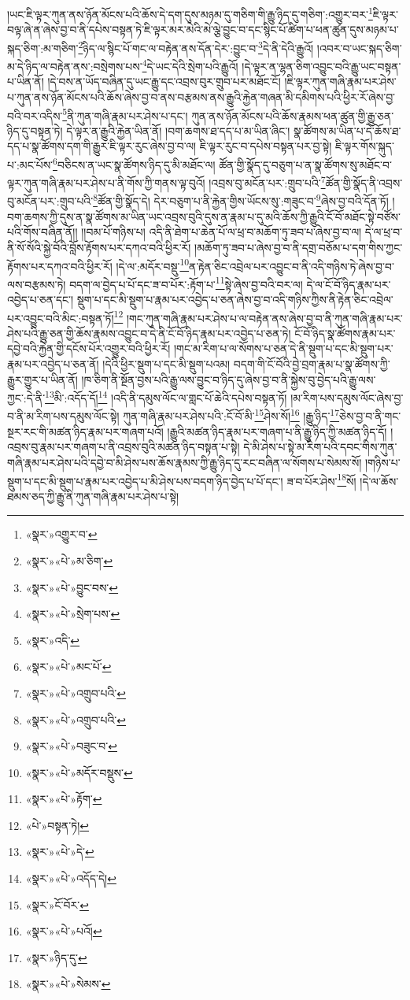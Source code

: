 །ཡང་ཇི་ལྟར་ཀུན་ནས་ཉོན་མོངས་པའི་ཆོས་དེ་དག་དུས་མཉམ་དུ་གཅིག་གི་རྒྱུ་ཉིད་དུ་གཅིག་:འགྱུར་བར་\footnote{«སྣར་»འགྱུར་བ་}ཇི་ལྟར་བལྟ་ཞེ་ན་ཞེས་བྱ་བ་ནི་དཔེས་བསྟན་ཏེ་ཇི་ལྟར་མར་མེའི་མེ་ལྕེ་བྱུང་བ་དང་སྙིང་པོ་ཚིག་པ་ཕན་ཚུན་དུས་མཉམ་པ་སྐད་ཅིག་:མ་གཅིག་\footnote{«སྣར་»«པེ་»མ་ཅིག་}ཉིད་ལ་སྙིང་པོ་གང་ལ་བརྟེན་ནས་དོན་དེར་:བྱུང་བ་\footnote{«སྣར་»«པེ་»བྱུང་བས་}དེ་ནི་དེའི་རྒྱུའོ། །འབར་བ་ཡང་སྐད་ཅིག་མ་དེ་ཉིད་ལ་བརྟེན་ནས་:བསྲེགས་པས་\footnote{«སྣར་»«པེ་»སྲེག་པས་}དེ་ཡང་དེའི་སྲེག་པའི་རྒྱུའོ། །དེ་ལྟར་ན་ལྷན་ཅིག་འབྱུང་བའི་རྒྱུ་ཡང་བསྟན་པ་ཡིན་ནོ། །དེ་བས་ན་ཡོད་བཞིན་དུ་ཡང་རྒྱུ་དང་འབྲས་བུར་གྲུབ་པར་མཐོང་ངོ། །ཇི་ལྟར་ཀུན་གཞི་རྣམ་པར་ཤེས་པ་ཀུན་ནས་ཉོན་མོངས་པའི་ཆོས་ཞེས་བྱ་བ་ནས་བརྩམས་ནས་རྒྱུའི་རྐྱེན་གཞན་མི་དམིགས་པའི་ཕྱིར་རོ་ཞེས་བྱ་བའི་བར་འདིས་\footnote{«སྣར་»འདི་}ནི་ཀུན་གཞི་རྣམ་པར་ཤེས་པ་དང་། ཀུན་ནས་ཉོན་མོངས་པའི་ཆོས་རྣམས་ཕན་ཚུན་གྱི་རྒྱུ་ཅན་ཉིད་དུ་བསྟན་ཏེ། དེ་ལྟར་ན་རྒྱུའི་རྐྱེན་ཡིན་ནོ། །བག་ཆགས་ཐ་དད་པ་མ་ཡིན་ཞིང་། སྣ་ཚོགས་མ་ཡིན་པ་དེ་ཆོས་ཐ་དད་པ་སྣ་ཚོགས་དག་གི་རྒྱུར་ཇི་ལྟར་རུང་ཞེས་བྱ་བ་ལ། ཇི་ལྟར་རུང་བ་དཔེས་བསྟན་པར་བྱ་སྟེ། ཇི་ལྟར་གོས་སྐུད་པ་:མང་པོས་\footnote{«སྣར་»«པེ་»མང་པོ་}བཅིངས་ན་ཡང་སྣ་ཚོགས་ཉིད་དུ་མི་མཐོང་ལ། ཚོན་གྱི་སྣོད་དུ་བཅུག་པ་ན་སྣ་ཚོགས་སུ་མཐོང་བ་ལྟར་ཀུན་གཞི་རྣམ་པར་ཤེས་པ་ནི་གོས་ཀྱི་གནས་ལྟ་བུའོ། །འབྲས་བུ་མངོན་པར་:གྲུབ་པའི་\footnote{«སྣར་»«པེ་»འགྲུབ་པའི་}ཚོན་གྱི་སྣོད་ནི་འབྲས་བུ་མངོན་པར་:གྲུབ་པའི་\footnote{«སྣར་»«པེ་»འགྲུབ་པའི་}ཚོན་གྱི་སྣོད་དེ། དེར་བཅུག་པ་ནི་རྐྱེན་གྱིས་ཡོངས་སུ་:གཟུང་བ་\footnote{«སྣར་»«པེ་»བཟུང་བ་}ཞེས་བྱ་བའི་དོན་ཏོ། །བག་ཆགས་ཀྱི་དུས་ན་སྣ་ཚོགས་མ་ཡིན་ཡང་འབྲས་བུའི་དུས་ན་རྣམ་པ་དུ་མའི་ཆོས་ཀྱི་རྒྱུའི་ངོ་བོ་མཐོང་སྟེ་བཙོས་པའི་གོས་བཞིན་ནོ།། །།བམ་པོ་གཉིས་པ། འདི་ནི་ཐེག་པ་ཆེན་པོ་ལ་ཕྲ་བ་མཆོག་ཏུ་ཟབ་པ་ཞེས་བྱ་བ་ལ། དེ་ལ་ཕྲ་བ་ནི་སོ་སོའི་སྐྱེ་བོའི་བློས་རྟོགས་པར་དཀའ་བའི་ཕྱིར་རོ། །མཆོག་ཏུ་ཟབ་པ་ཞེས་བྱ་བ་ནི་དགྲ་བཅོམ་པ་དག་གིས་ཀྱང་རྟོགས་པར་དཀའ་བའི་ཕྱིར་རོ། །དེ་ལ་:མདོར་བསྡུ་\footnote{«སྣར་»«པེ་»མདོར་བསྡུས་}ན་རྟེན་ཅིང་འབྲེལ་པར་འབྱུང་བ་ནི་འདི་གཉིས་ཏེ་ཞེས་བྱ་བ་ལས་བརྩམས་ཏེ། བདག་ལ་བྱེད་པ་པོ་དང་ཟ་བ་པོར་:རྟོག་པ་\footnote{«སྣར་»«པེ་»རྟོག་}སྟེ་ཞེས་བྱ་བའི་བར་ལ། དེ་ལ་ངོ་བོ་ཉིད་རྣམ་པར་འབྱེད་པ་ཅན་དང་། སྡུག་པ་དང་མི་སྡུག་པ་རྣམ་པར་འབྱེད་པ་ཅན་ཞེས་བྱ་བ་འདི་གཉིས་ཀྱིས་ནི་རྟེན་ཅིང་འབྲེལ་པར་འབྱུང་བའི་མིང་:བསྟན་ཏོ།\footnote{«པེ་»བསྟན་ཏེ།} །གང་ཀུན་གཞི་རྣམ་པར་ཤེས་པ་ལ་བརྟེན་ནས་ཞེས་བྱ་བ་ནི་ཀུན་གཞི་རྣམ་པར་ཤེས་པའི་རྒྱུ་ཅན་གྱི་ཆོས་རྣམས་འབྱུང་བ་དེ་ནི་ངོ་བོ་ཉིད་རྣམ་པར་འབྱེད་པ་ཅན་ཏེ། ངོ་བོ་ཉིད་སྣ་ཚོགས་རྣམ་པར་དབྱེ་བའི་རྐྱེན་གྱི་དངོས་པོར་འགྱུར་བའི་ཕྱིར་རོ། །གང་མ་རིག་པ་ལ་སོགས་པ་ཅན་དེ་ནི་སྡུག་པ་དང་མི་སྡུག་པར་རྣམ་པར་འབྱེད་པ་ཅན་ནོ། །དེའི་ཕྱིར་སྡུག་པ་དང་མི་སྡུག་པའམ། བདག་གི་ངོ་བོའི་བྱེ་བྲག་རྣམ་པ་སྣ་ཚོགས་ཀྱི་རྒྱུར་གྱུར་པ་ཡིན་ནོ། །ཁ་ཅིག་ནི་སྔོན་བྱས་པའི་རྒྱུ་ལས་བྱུང་བ་ཉིད་དུ་ཞེས་བྱ་བ་ནི་སྐྱེས་བུ་བྱེད་པའི་རྒྱུ་ལས་ཀྱང་:དེ་ནི་\footnote{«སྣར་»«པེ་»དེ་}མི་:འདོད་དོ།\footnote{«སྣར་»«པེ་»འདོད་དེ།} །འདི་ནི་དམུས་ལོང་ལ་གླང་པོ་ཆེའི་དཔེས་བསྟན་ཏོ། །མ་རིག་པས་དམུས་ལོང་ཞེས་བྱ་བ་ནི་མ་རིག་པས་དམུས་ལོང་སྟེ། ཀུན་གཞི་རྣམ་པར་ཤེས་པའི་:ངོ་བོ་མི་\footnote{«སྣར་»ངོ་བོར་}ཤེས་སོ།\footnote{«སྣར་»«པེ་»པའོ།} །རྒྱུ་ཉིད་\footnote{«སྣར་»ཉིད་དུ་}ཅེས་བྱ་བ་ནི་གང་སྔར་རང་གི་མཚན་ཉིད་རྣམ་པར་གཞག་པའོ། །རྒྱུའི་མཚན་ཉིད་རྣམ་པར་གཞག་པ་ནི་རྒྱུ་ཉིད་ཀྱི་མཚན་ཉིད་དོ། །འབྲས་བུ་རྣམ་པར་གཞག་པ་ནི་འབྲས་བུའི་མཚན་ཉིད་བསྟན་པ་སྟེ། དེ་མི་ཤེས་པ་སྟེ་མ་རིག་པའི་དབང་གིས་ཀུན་གཞི་རྣམ་པར་ཤེས་པའི་དབྱེ་བ་མི་ཤེས་པས་ཆོས་རྣམས་ཀྱི་རྒྱུ་ཉིད་དུ་རང་བཞིན་ལ་སོགས་པ་སེམས་སོ། །གཉིས་པ་སྡུག་པ་དང་མི་སྡུག་པ་རྣམ་པར་འབྱེད་པ་མི་ཤེས་པས་བདག་ཉིད་བྱེད་པ་པོ་དང་། ཟ་བ་པོར་ཤེས་\footnote{«སྣར་»«པེ་»སེམས་}སོ། །དེ་ལ་ཆོས་ཐམས་ཅད་ཀྱི་རྒྱུ་ནི་ཀུན་གཞི་རྣམ་པར་ཤེས་པ་སྟེ། 